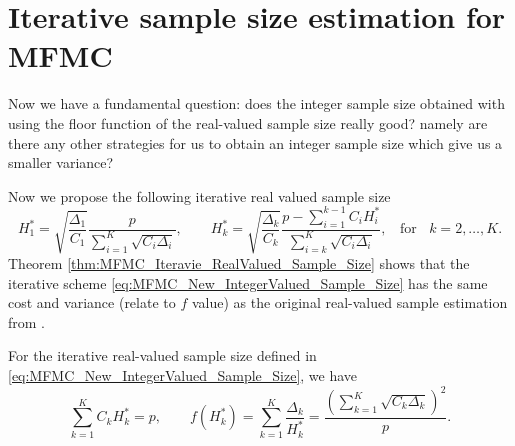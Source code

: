 \section{Iterative sample size estimation for MFMC}\label{sec:Iterative_IntegerValued_Sample_Size}

Now we have a fundamental question: does the integer sample size obtained with using the floor function of the real-valued sample size really good? namely are there any other strategies for us to obtain an integer sample size which give us a smaller variance?

Now we propose the following iterative real valued sample size
%
\begin{equation}
    \label{eq:MFMC_New_IntegerValued_Sample_Size}
    H_1^* = \sqrt{\frac{\Delta_1}{C_1}}\frac{p}{\sum_{i=1}^K\sqrt{C_i\Delta_i}}, \qquad H_k^* = \sqrt{\frac{\Delta_k}{C_k}}\frac{p-\sum_{i=1}^{k-1}C_iH_i^*}{\sum_{i=k}^K\sqrt{C_i\Delta_i}}, \;\;\text{ for }\;\; k = 2,\ldots, K.
\end{equation}
%
Theorem \ref{thm:MFMC_Iteravie_RealValued_Sample_Size} shows that the iterative scheme \eqref{eq:MFMC_New_IntegerValued_Sample_Size} has the same cost and variance (relate to $f$ value) as the original real-valued sample estimation from \cite{PeGuWi:2018}. 

\begin{theorem}\label{thm:MFMC_Iteravie_RealValued_Sample_Size}
For the iterative real-valued sample size defined in \eqref{eq:MFMC_New_IntegerValued_Sample_Size}, we have
\[
\sum_{k=1}^K C_kH_k^*=p,\qquad  f(H_k^*) = \sum_{k=1}^K\frac{\Delta_k}{H_k^*} = \frac{\left(\sum_{k=1}^K\sqrt{C_k\Delta_k}\right)^2}{p}.
\]
\end{theorem}

